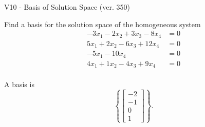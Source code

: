 \begin{exercise}
  \begin{exerciseTitle}V10 - Basis of Solution Space (ver. 350)\end{exerciseTitle}
  \begin{exerciseStatement}
    Find a basis for the solution space of the homogeneous system 
\begin{align*}
 -3 x_ 1 -2 x_ 2 + 3 x_ 3 -8 x_ 4 &= 0  \\ 
  5 x_ 1 + 2 x_ 2 -6 x_ 3 + 12 x_ 4 &= 0  \\ 
  -5 x_ 1 -10 x_ 4 &= 0  \\ 
  4 x_ 1 + 1 x_ 2 -4 x_ 3 + 9 x_ 4 &= 0  \\ 
 \end{align*}


 
  \end{exerciseStatement}

  \begin{exerciseAnswer}
   A basis is   
\[\left\{\left[\begin{array}{c}
-2 \\
-1 \\
0 \\
1
\end{array}\right]\right\}.\]

  


  \end{exerciseAnswer}
\end{exercise}